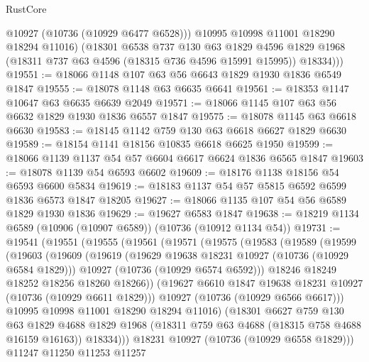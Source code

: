 \begin{lexlean}{RustCore}
\begin{coremodule}
            @10927
            (@10736 (@10929 @6477 @6528)))
          @10995
          @10998
          @11001
          @18290
          @18294
          @11016)
        (@18301
          @6538
          @737
          @130
          @63
          @1829
          @4596
          @1829
          @1968
          (@18311 @737 @63 @4596 (@18315 @736 @4596 @15991 @15995))
          @18334)))
@19551 := @18066 @1148 @107 @63 @56 @6643 @1829 @1930 @1836 @6549 @1847
@19555 := @18078 @1148 @63 @6635 @6641
@19561 := @18353 @1147 @10647 @63 @6635 @6639 @2049
@19571 := @18066 @1145 @107 @63 @56 @6632 @1829 @1930 @1836 @6557 @1847
@19575 := @18078 @1145 @63 @6618 @6630
@19583 := @18145 @1142 @759 @130 @63 @6618 @6627 @1829 @6630
@19589 := @18154 @1141 @18156 @10835 @6618 @6625 @1950
@19599 := @18066 @1139 @1137 @54 @57 @6604 @6617 @6624 @1836 @6565 @1847
@19603 := @18078 @1139 @54 @6593 @6602
@19609 := @18176 @1138 @18156 @54 @6593 @6600 @5834
@19619 := @18183 @1137 @54 @57 @5815 @6592 @6599 @1836 @6573 @1847 @18205
@19627 := @18066 @1135 @107 @54 @56 @6589 @1829 @1930 @1836
@19629 := @19627 @6583 @1847
@19638 := @18219 @1134 @6589 (@10906 (@10907 @6589)) (@10736 (@10912 @1134 @54))
@19731 := @19541
    (@19551
      (@19555
        (@19561
          (@19571
            (@19575
              (@19583
                (@19589
                  (@19599
                    (@19603
                      (@19609
                        (@19619
                          (@19629 @19638 @18231 @10927 (@10736 (@10929 @6584 @1829)))
                          @10927
                          (@10736 (@10929 @6574 @6592)))
                        @18246
                        @18249
                        @18252
                        @18256
                        @18260
                        @18266))
                    (@19627 @6610 @1847 @19638 @18231 @10927 (@10736 (@10929 @6611 @1829)))
                    @10927
                    (@10736 (@10929 @6566 @6617)))
                  @10995
                  @10998
                  @11001
                  @18290
                  @18294
                  @11016)
                (@18301
                  @6627
                  @759
                  @130
                  @63
                  @1829
                  @4688
                  @1829
                  @1968
                  (@18311 @759 @63 @4688 (@18315 @758 @4688 @16159 @16163))
                  @18334)))
            @18231
            @10927
            (@10736 (@10929 @6558 @1829)))
          @11247
          @11250
          @11253
          @11257

\end{coremodule}
\end{lexlean}
